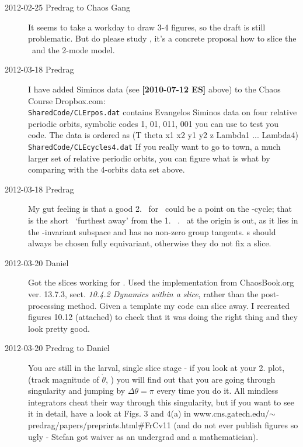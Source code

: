 \begin{description}
\item[2012-02-25 Predrag to Chaos Gang]
It seems to take a workday to draw 3-4 figures, so the draft is still
problematic. But do please study , it's a
concrete proposal how to slice the \cLf\ and the 2-mode model.

\item[2012-03-18 Predrag] I have added Siminos data (see {\bf [2010-07-12
ES]} above) to the Chaos Course Dropbox.com:
\\
          \texttt{SharedCode/CLErpos.dat}
            contains Evangelos Siminos data on four relative periodic
            orbits, symbolic codes 1, 01, 011, 001 you can use to test
            you code. The data is ordered as
            (T theta x1 x2 y1 y2 z Lambda1 ... Lambda4)
\\
          \texttt{SharedCode/CLEcycles4.dat}
            If you really want to go to town, a much larger set of
            relative periodic orbits, you can figure what is what by
            comparing with the 4-orbits data set above.

\item[2012-03-18 Predrag] My gut feeling is that a good 2. \template\ for
\cLf\ could be a point on the -cycle; that is the short \rpo\
`furthest away' from the 1. \template\ . \Eqv\ at the origin is
out, as it lies in the \Group-invariant subspace and has no non-zero
group tangents. \Template s should always be chosen fully equivariant,
otherwise they do not fix a slice.

\item[2012-03-20 Daniel]
Got the slices working for \cLf. Used the implementation from
ChaosBook.org ver. 13.7.3, sect. \emph{10.4.2 Dynamics within a slice},
rather than the post-processing method. Given a template my code can
slice away. I recreated figures 10.12 (attached) to check that it was
doing the right thing and they look pretty good.


\item[2012-03-20 Predrag  to Daniel]
You are still in the larval, single slice stage - if you look at your 2.
plot, (track magnitude of $\dot{\theta}$, \etc) you will find out that
you are going through singularity and jumping by $\Delta \theta = \pi$
every time you do it. All mindless integrators cheat their way through
this singularity, but if you want to see it in detail, have a look at
Figs. 3 and 4(a) in
{www.cns.gatech.edu/$\sim$predrag/papers/preprints.html\#FrCv11} (and do
not ever publish figures so ugly - Stefan\rf{FrCv11} got waiver as an
undergrad and a mathematician).


\end{description}
